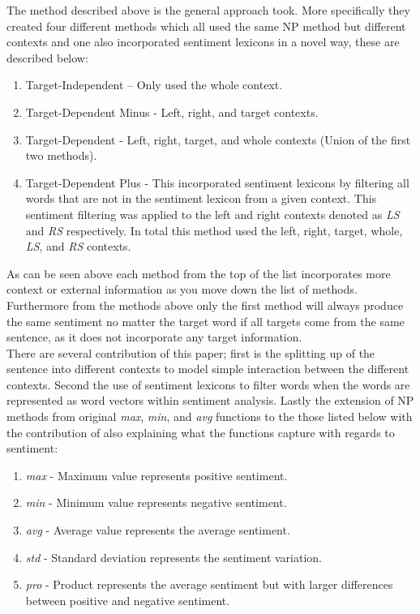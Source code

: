 The method described above is the general approach \citet{vo2015target} took. More specifically they created four different methods which all used the same NP method but different contexts and one also incorporated sentiment lexicons in a novel way, these are described below:
\begin{enumerate}
    \item Target-Independent -- Only used the whole context.
    \item Target-Dependent Minus - Left, right, and target contexts.
    \item Target-Dependent - Left, right, target, and whole contexts (Union of the first two methods).
    \item Target-Dependent Plus - This incorporated sentiment lexicons by filtering all words that are not in the sentiment lexicon from a given context. This sentiment filtering was applied to the left and right contexts denoted as \textit{LS} and \textit{RS} respectively. In total this method used the left, right, target, whole, \textit{LS}, and \textit{RS} contexts.
\end{enumerate}
As can be seen above each method from the top of the list incorporates more context or external information as you move down the list of methods. Furthermore from the methods above only the first method will always produce the same sentiment no matter the target word if all targets come from the same sentence, as it does not incorporate any target information.\\
There are several contribution of this paper; first is the splitting up of the sentence into different contexts to model simple interaction between the different contexts. Second the use of sentiment lexicons to filter words when the words are represented as word vectors within sentiment analysis. Lastly the extension of NP methods from \citet{tang-etal-2014-learning} original \textit{max}, \textit{min}, and \textit{avg} functions to the those listed below with the contribution of also explaining what the functions capture with regards to sentiment:
\begin{enumerate}
    \item \textit{max} - Maximum value represents positive sentiment.
    \item \textit{min} - Minimum value represents negative sentiment.
    \item \textit{avg} - Average value represents the average sentiment.
    \item \textit{std} - Standard deviation represents the sentiment variation.
    \item \textit{pro} - Product represents the average sentiment but with larger differences between positive and negative sentiment.
\end{enumerate}

